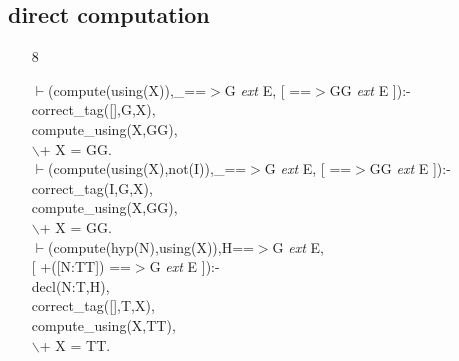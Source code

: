 \documentclass[11pt]{report}
\begin{document}
 \subsection{direct computation}
 \begin{enumerate}
 \item[8]
\begin{sf}\begin{tabbing}
$\vdash$(compute(using(X)),\_\hspace{0.1em}==$>$G \mbox{\it ext} E, [ ==$>$GG \mbox{\it ext} E ]):-\\[-0.15ex]
\hspace{2em}correct\_\hspace{0.1em}tag([],G,X),     \\[-0.15ex]
\hspace{2em}compute\_\hspace{0.1em}using(X,GG),\\[-0.15ex]
\hspace{2em}$\backslash$+ X = GG.  \\[-0.15ex]
$\vdash$(compute(using(X),not(I)),\_\hspace{0.1em}==$>$G \mbox{\it ext} E, [ ==$>$GG \mbox{\it ext} E  ]):-\\[-0.15ex]
\hspace{2em}correct\_\hspace{0.1em}tag(I,G,X),     \\[-0.15ex]
\hspace{2em}compute\_\hspace{0.1em}using(X,GG),\\[-0.15ex]
\hspace{2em}$\backslash$+ X = GG.\\[-0.15ex]
$\vdash$(compute(hyp(N),using(X)),H==$>$G \mbox{\it ext} E,\\[-0.15ex]
\hspace{4em}[ +([N:TT]) ==$>$G \mbox{\it ext} E ]):-\\[-0.15ex]
\hspace{2em}decl(N:T,H),\\[-0.15ex]
\hspace{2em}correct\_\hspace{0.1em}tag([],T,X),\\[-0.15ex]
\hspace{2em}compute\_\hspace{0.1em}using(X,TT),\\[-0.15ex]
\hspace{2em}$\backslash$+ X = TT.  \\[-0.15ex]

\end{tabbing}
\end{sf}
\end{enumerate}
\end{document}
